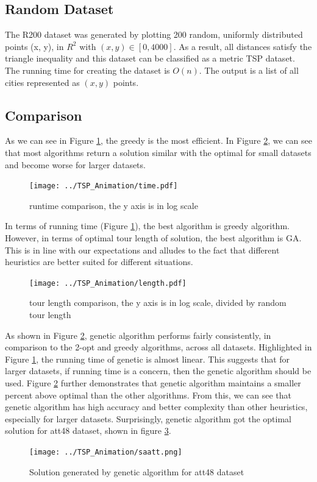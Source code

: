 \documentclass[10pt,twocolumn,letterpaper]{article}
\begin{document}
\subsection{Random Dataset}
The R200 dataset was generated by plotting 200 random, 
uniformly distributed points (x, y), in $R^2$ with $(x, y) \in
[0, 4000]$. As a result, all
distances satisfy the triangle inequality and this dataset can
be classified as a metric TSP dataset. The running time
for creating the dataset is $O(n)$. 
The output is a list of all cities represented as $(x,y)$ points.

\subsection{Comparison}
As we can see in Figure \ref{fig:tsp}, the greedy is the most efficient. In Figure \ref{fig:length},
we can see that most algorithms return a solution similar with the optimal for small datasets and become worse for larger datasets.
\begin{figure}
\centering
\texttt{[image: ../TSP\_Animation/time.pdf]}
\caption{runtime comparison, the y axis is in log scale}
\label{fig:tsp}
\end{figure}

In terms of running time (Figure \ref{fig:tsp}), the best algorithm is greedy algorithm. However, in terms of optimal tour length of solution, the best algorithm is GA. This is in line with our expectations and alludes to the fact that different heuristics
are better suited for different situations.
\begin{figure}
	\centering
	\texttt{[image: ../TSP\_Animation/length.pdf]}
	\caption{tour length comparison, the y axis is in log scale, divided by random tour length}
	\label{fig:length}
\end{figure}

As shown in Figure \ref{fig:length}, genetic algorithm performs fairly consistently, in comparison to the 2-opt and greedy algorithms, across all datasets. Highlighted in
Figure \ref{fig:tsp}, the running time of genetic is almost linear. This suggests that for larger
datasets, if running time is a concern, then the genetic
algorithm should be used. Figure \ref{fig:length} further demonstrates
that genetic algorithm maintains a smaller percent above
optimal than the other algorithms. From this, we can see
that genetic algorithm has high accuracy and better complexity than other heuristics, especially for larger datasets. Surprisingly, genetic algorithm got the optimal solution for att48 dataset, shown in figure \ref{fig:saatt}.
\begin{figure}
\centering
\texttt{[image: ../TSP\_Animation/saatt.png]}
\caption{Solution generated by genetic algorithm for att48 dataset}
\label{fig:saatt}
\end{figure}
\end{document}
